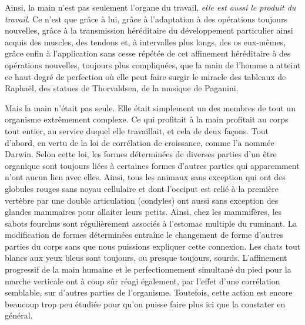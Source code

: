 \documentclass[french,twoside]{book} %
\begin{document}
Ainsi, la main n’est pas seulement l’organe du travail, \emph{elle est aussi le produit du travail}. Ce n’est que grâce à lui, grâce à l’adaptation à des opérations toujours nouvelles, grâce à la transmission héréditaire du développement particulier ainsi acquis des muscles, des tendons et, à intervalles plus longs, des os eux-mêmes, grâce enfin à l’application sans cesse répétée de cet affinement héréditaire à des opérations nouvelles, toujours plus compliquées, que la main de l’homme a atteint ce haut degré de perfection où elle peut faire surgir le miracle des tableaux de Raphaël, des statues de Thorvaldsen, de la musique de Paganini.\par
Mais la main n’était pas seule. Elle était simplement un des membres de tout un organisme extrêmement complexe. Ce qui profitait à la main profitait au corps tout entier, au service duquel elle travaillait, et cela de deux façons. Tout d’abord, en vertu de la loi de corrélation de croissance, comme l’a nommée Darwin. Selon cette loi, les formes déterminées de diverses parties d’un être organique sont toujours liées à certaines formes d’autres parties qui apparemment n’ont aucun lien avec elles. Ainsi, tous les animaux sans exception qui ont des globules rouges sans noyau cellulaire et dont l’occiput est relié à la première vertèbre par une double articulation (condyles) ont aussi sans exception des glandes mammaires pour allaiter leurs petits. Ainsi, chez les mammifères, les sabots fourchus sont régulièrement associés à l’estomac multiple du ruminant. La modification de formes déterminées entraîne le changement de forme d’autres parties du corps sans que nous puissions expliquer cette connexion. Les chats tout blancs aux yeux bleus sont toujours, ou presque toujours, sourds. L’affinement progressif de la main humaine et le perfectionnement simultané du pied pour la marche verticale ont à coup sûr réagi également, par l’effet d’une corrélation semblable, sur d’autres parties de l’organisme. Toutefois, cette action est encore beaucoup trop peu étudiée pour qu’on puisse faire plus ici que la constater en général.\par
\end{document}
